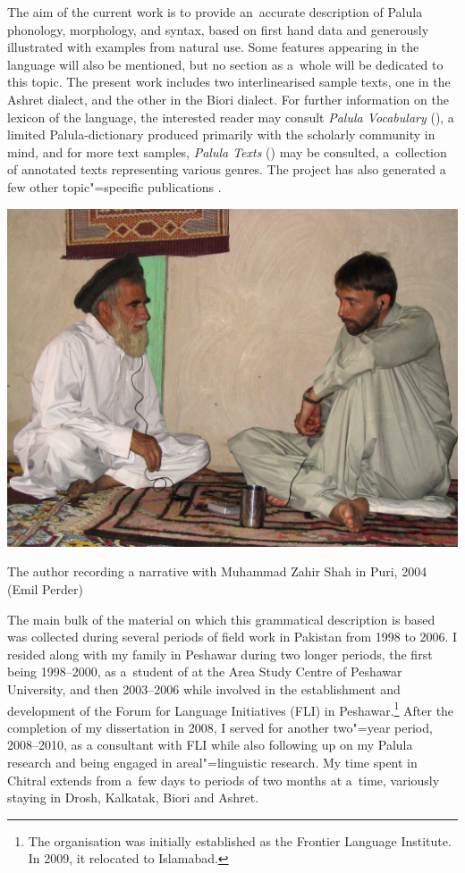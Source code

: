 The aim of the current work is to provide an~accurate description of Palula phonology, morphology,
and syntax, based on first hand data and generously illustrated with examples from natural use. Some
 features appearing in the language will also be mentioned, but no section as a~whole will
be dedicated to this topic. The present work includes two interlinearised sample texts, one in the Ashret dialect, and the other in the Biori dialect. For further information on the lexicon of the language, the interested reader may consult \textit{Palula Vocabulary} (\citealt{liljegrenhaider2011}), a limited Palula-\iliEnglish dictionary produced primarily with the scholarly community in mind, and for more text samples, \textit{Palula Texts} (\citealt{liljegrenhaider2015}) may be consulted, a~collection of annotated texts representing various genres. The project has also generated a few other topic"=specific publications \citep{liljegren2009,liljegrenhaider2009,liljegren2010,liljegrenhaider2015b}. 

\begin{photofigure}
 \includegraphics[width=\textwidth]{photos/Photo09--RecordingPuri.JPG}
\caption{The author recording a narrative with Muhammad Zahir Shah in Puri, 2004 (Emil Perder)}
\end{photofigure}

The main bulk of the material on which this grammatical description is based was collected during
several periods of field work in Pakistan from 1998 to 2006. I resided along with my family in
Peshawar during two longer periods, the first being 1998--2000, as a~student of \iliPashto at the Area
Study Centre of Peshawar University, and then 2003--2006 while involved in the establishment and
development of the Forum for Language Initiatives (FLI) in Peshawar.\footnote{The organisation was initially established as the Frontier Language Institute. In 2009, it relocated to Islamabad.} After the completion of my dissertation in 2008, I served for another two"=year period, 2008--2010, as a consultant with FLI while also following up on my Palula research and being engaged in areal"=linguistic research. My time spent in Chitral extends from
a~few days to periods of two months at a~time, variously staying in Drosh, Kalkatak, Biori and Ashret.


